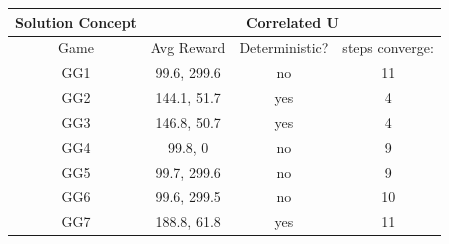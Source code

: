 \hspace{5mm}\begin{tabular}{||c||c|c|c||}
	\hline
	Solution Concept&  \multicolumn{3}{|c||}{Correlated U}\\ \hline
	Game & Avg Reward & Deterministic? & steps converge:\\ \hline \hline
	GG1 & 99.6, 299.6 & no & 11 \\ \hline
	GG2 & 144.1, 51.7 & yes & 4\\ \hline
	GG3 & 146.8, 50.7 & yes & 4\\ \hline
	GG4 & 99.8, 0 & no & 9 \\ \hline
	GG5 & 99.7, 299.6 & no & 9 \\ \hline
	GG6 & 99.6, 299.5 & no & 10 \\ \hline
	GG7 & 188.8, 61.8 & yes & 11 \\ \hline
	
	
\end{tabular}




